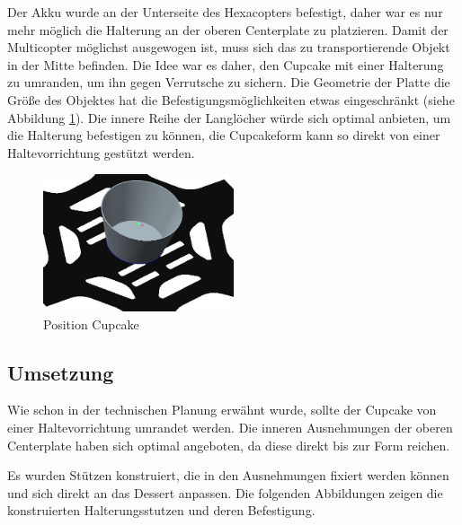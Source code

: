 		Der Akku wurde an der Unterseite des Hexacopters befestigt, daher war es nur mehr möglich die Halterung an der oberen Centerplate zu platzieren.
		Damit der Multicopter möglichst ausgewogen ist, muss sich das zu transportierende Objekt in der Mitte befinden.
		Die Idee war es daher, den Cupcake mit einer Halterung zu umranden, um ihn gegen Verrutsche zu sichern. Die Geometrie der Platte \bzw die Größe des Objektes hat die Befestigungsmöglichkeiten etwas eingeschränkt (siehe Abbildung \ref{platte_cupcake}).
		Die innere Reihe der Langlöcher würde sich optimal anbieten, um die Halterung befestigen zu können, die Cupcakeform kann so direkt von einer Haltevorrichtung gestützt werden.


			\begin{figure}[tbh]
			\begin{centering}
			\includegraphics[width = 0.5\textwidth]{Bilder/platte_cupcake}
			\par\end{centering}
			\caption{Position Cupcake}
			\label{platte_cupcake}
			\end{figure}

	\subsection{Umsetzung}

	Wie schon in der technischen Planung erwähnt wurde, sollte der Cupcake von einer Haltevorrichtung umrandet werden.
	Die inneren Ausnehmungen der oberen Centerplate haben sich optimal angeboten, da diese direkt bis zur Form reichen.

	Es wurden Stützen konstruiert, die in den Ausnehmungen fixiert werden können und sich direkt an das Dessert anpassen.
	Die folgenden Abbildungen zeigen die konstruierten Halterungsstutzen und deren Befestigung.

